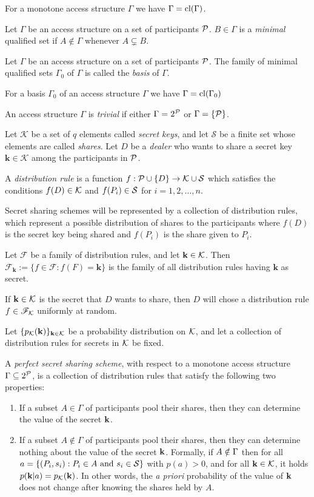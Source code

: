 For a monotone access structure $\Gamma$ we have $\Gamma = \text{cl} (\Gamma)$.

 Let $\Gamma$ be an access structure on a set of participants ${\mathcal P}$. $B \in \Gamma$ is a \textit{minimal} qualified set if $A \notin \Gamma$ whenever $A \subsetneq B$.

 Let $\Gamma$ be an access structure on a set of participants ${\mathcal P}$. The family of minimal qualified sets $\Gamma_{0}$ of $\Gamma$ is called the \textit{basis} of $\Gamma$.

For a basis $\Gamma_0$ of an access structure $\Gamma$ we have $\Gamma = \text{cl} (\Gamma_{0})$

 An access structure $\Gamma$ is \textit{trivial} if either $\Gamma = 2^{{\mathcal P}}$ or $\Gamma = \{ {\mathcal P} \}$.

Let $\mathcal{K}$ be a set of $q$ elements called \textit{secret keys}, and let $\mathcal{S}$ be a finite set whose elements are called \textit{shares}. Let $D$ be a \textit{dealer} who wants to share a secret key $\mathbf{k} \in \mathcal{K}$ among the participants in ${\mathcal P}$. 

 A \textit{distribution rule} is a function $f : {\mathcal P} \cup \{ D \} \rightarrow \mathcal{K} \cup \mathcal{S}$ which satisfies the conditions $f(D) \in \mathcal{K}$ and $f(P_i) \in \mathcal{S}$ for $i = 1,2, \dots, n$.

Secret sharing schemes will be represented by a collection of distribution rules, which represent a possible distribution of shares to the participants where $f(D)$ is the secret key being shared and $f(P_i)$ is the share given to $P_i$.

 Let $\mathscr{F}$ be a family of distribution rules, and let $\mathbf{k} \in \mathcal{K}$. Then $\mathscr{F}_{\mathbf{k}} := \{ f \in \mathscr{F} : f(F) = \mathbf{k}\}$ is the family of all distribution rules having $\mathbf{k}$ as secret.

If $\mathbf{k} \in \mathcal{K}$ is the secret that $D$ wants to share, then $D$ will chose a distribution rule $f \in {\mathscr F}_{\mathcal{K}}$ uniformly at random.


Let $\{p_{\mathcal{K}} (\mathbf{k}) \}_{\mathbf{k} \in \mathcal{K}}$ be a probability distribution on $\mathcal{K}$, and let a collection of distribution rules for secrets in $\mathcal{K}$ be fixed.

 A \textit{perfect secret sharing scheme}, with respect to a monotone access structure $\Gamma \subseteq 2^{{\mathcal P}}$, is a collection of distribution rules that satisfy the following two properties:
\begin{enumerate}
    \item If a subset $A \in \Gamma$ of participants pool their shares, then they can determine the value of the secret $\mathbf{k}$.
    \item If a subset $A \notin \Gamma$ of participants pool their shares, then they can determine nothing about the value of the secret $\mathbf{k}$. Formally, if $A \notin \Gamma$ then for all $a = \{ (P_i, s_i): P_i \in A \text{ and } s_i \in \mathcal{S} \}$ with $p(a)>0$, and for all $\mathbf{k} \in \mathcal{K}$, it holds $p(\mathbf{k} \vert a) = p_{\mathcal{K}}(\mathbf{k})$. In other words, the \textit{a priori} probability of the value of $\mathbf{k}$ does not change after knowing the shares held by $A$.
\end{enumerate}

